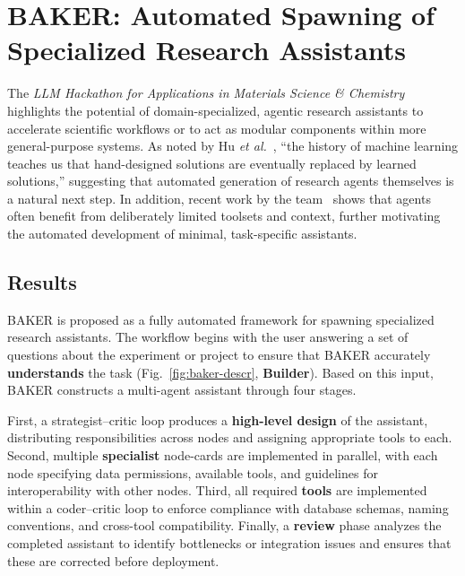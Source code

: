 \section{BAKER: Automated Spawning of Specialized Research Assistants}


The \textit{LLM Hackathon for Applications in Materials Science \& Chemistry} highlights the potential of domain-specialized, agentic research assistants to accelerate scientific workflows or to act as modular components within more general-purpose systems. As noted by Hu \textit{et al.}~\cite{hu2025automateddesignagenticsystems}, “the history of machine learning teaches us that hand-designed solutions are eventually replaced by learned solutions,” suggesting that automated generation of research agents themselves is a natural next step. In addition, recent work by the team~\cite{akke2025bayesian} shows that agents often benefit from deliberately limited toolsets and context, further motivating the automated development of minimal, task-specific assistants.

\subsection*{Results}
BAKER is proposed as a fully automated framework for spawning specialized research assistants. The workflow begins with the user answering a set of questions about the experiment or project to ensure that BAKER accurately \textbf{understands} the task (Fig.~\ref{fig:baker-descr}, \textbf{Builder}). Based on this input, BAKER constructs a multi-agent assistant through four stages.

First, a strategist–critic loop produces a \textbf{high-level design} of the assistant, distributing responsibilities across nodes and assigning appropriate tools to each. Second, multiple \textbf{specialist} node-cards are implemented in parallel, with each node specifying data permissions, available tools, and guidelines for interoperability with other nodes. Third, all required \textbf{tools} are implemented within a coder–critic loop to enforce compliance with database schemas, naming conventions, and cross-tool compatibility. Finally, a \textbf{review} phase analyzes the completed assistant to identify bottlenecks or integration issues and ensures that these are corrected before deployment.

